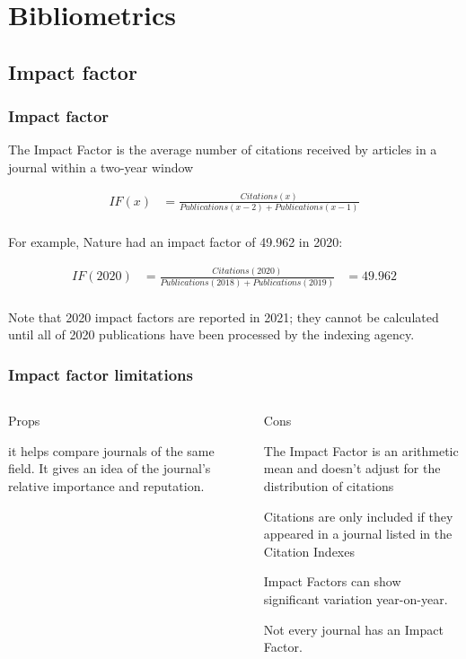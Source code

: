 \documentclass{beamer}
\begin{document}
\section{Bibliometrics}

\subsection{Impact factor}
\begin{frame}
    \frametitle{Impact factor}
    The Impact Factor is the average number of citations received by articles in a journal within a two-year window
    
    \begin{align*}
        IF(x) &= \frac{ Citations(x)}{ Publications(x - 2 ) +  Publications(x - 1) }\\
    \end{align*}

    For example, Nature had an impact factor of 49.962 in 2020:
    
    \begin{align*}
        IF(2020) &= \frac{ Citations(2020)}{ Publications(2018) +  Publications(2019) } &= 49.962\\
    \end{align*}

    Note that 2020 impact factors are reported in 2021; they cannot be calculated until all of 2020
    publications have been processed by the indexing agency.

\end{frame}
\begin{frame}
    \frametitle{Impact factor limitations}
    \begin{columns}[T]
        \begin{column}{.5\textwidth} \pause
            \centering Props
            \begin{propslist}
                \item it helps compare journals of the same field. It gives an idea of the journal’s relative importance and reputation. \pause
            \end{propslist}
        \end{column}
        \begin{column}{.5\textwidth}
            \centering Cons %
            \begin{conslist}
                \item The Impact Factor is an arithmetic mean and doesn’t adjust for the distribution of citations \pause
                \item Citations are only included if they appeared in a journal listed in the Citation Indexes \pause
                \item Impact Factors can show significant variation year-on-year.  \pause
                \item Not every journal has an Impact Factor.  \pause
            \end{conslist}
        \end{column}
    \end{columns}


\end{frame}
\end{document}
